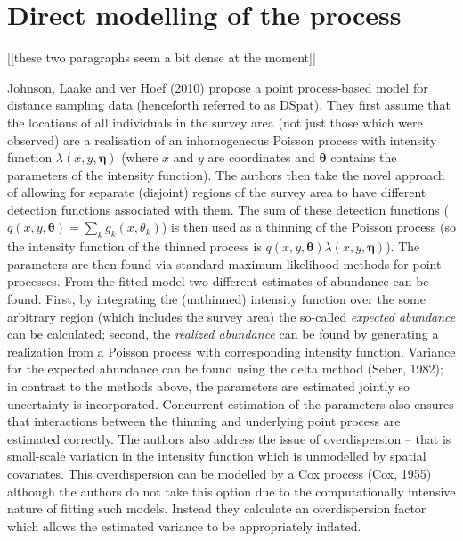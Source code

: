 \documentclass[useAMS,referee]{biom}
\begin{document}
\section{Direct modelling of the process}
\label{s:direct}

[[these two paragraphs seem a bit dense at the moment]]

Johnson, Laake and ver Hoef (2010) propose a point process-based model for distance sampling data (henceforth referred to as DSpat). They first assume that the locations of all individuals in the survey area (not just those which were observed) are a realisation of an inhomogeneous Poisson process with intensity function $\lambda(x,y,\bm{\eta})$ (where $x$ and $y$ are coordinates and $\bm{\theta}$ contains the parameters of the intensity function). The authors then take the novel approach of allowing for separate (disjoint) regions of the survey area to have different detection functions associated with them. The sum of these detection functions ($q(x,y,\bm{\theta}) = \sum_k g_k(x,\theta_k)$) is then used as a thinning of the Poisson process (so the intensity function of the thinned process is $q(x,y,\bm{\theta})\lambda(x,y,\bm{\eta})$). The parameters are then found via standard maximum likelihood methods for point processes. From the fitted model two different estimates of abundance can be found. First, by integrating the (unthinned) intensity function over the some arbitrary region (which includes the survey area) the so-called \textit{expected abundance} can be calculated; second, the \textit{realized abundance} can be found by generating a realization from a Poisson process with corresponding intensity function. Variance for the expected abundance can be found using the delta method (Seber, 1982); in contrast to the methods above, the parameters are estimated jointly so uncertainty is incorporated. Concurrent estimation of the parameters also ensures that interactions between the thinning and underlying point process are estimated correctly. The authors also address the issue of overdispersion -- that is small-scale variation in the intensity function which is unmodelled by spatial covariates. This overdispersion can be modelled by a Cox process (Cox, 1955) although the authors do not take this option due to the computationally intensive nature of fitting such models. Instead they calculate an overdispersion factor which allows the estimated variance to be appropriately inflated.
\end{document}
